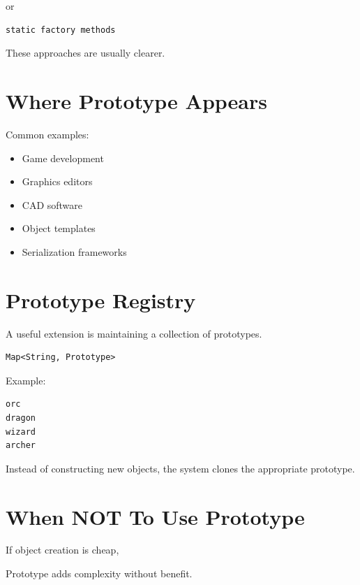 \documentclass[11pt,a4paper]{book}
\begin{document}
or

\begin{verbatim}
static factory methods
\end{verbatim}

These approaches are usually clearer.


\section{Where Prototype Appears}

Common examples:

\begin{itemize}

\item Game development
\item Graphics editors
\item CAD software
\item Object templates
\item Serialization frameworks
\end{itemize}


\section{Prototype Registry}

A useful extension is maintaining
a collection of prototypes.

\begin{verbatim}
Map<String, Prototype>
\end{verbatim}

Example:

\begin{verbatim}
orc
dragon
wizard
archer
\end{verbatim}

Instead of constructing new objects,
the system clones the appropriate prototype.


\section{When NOT To Use Prototype}

\begin{trap}

If object creation is cheap,

Prototype adds complexity without benefit.

\end{trap}
\end{document}
